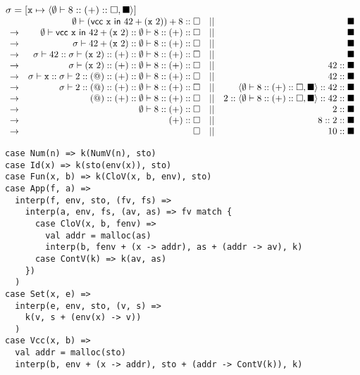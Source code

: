 $\sigma=[\texttt{x}\mapsto\langle\emptyset\vdash8::(+)::\square,\blacksquare\rangle]$
\\
$
\begin{array}{lrcr}
& \emptyset\vdash (\textsf{vcc}\ \texttt{x}\ \textsf{in}\ 42+(\texttt{x}\ 2))+8::\square &||& \blacksquare \\
\rightarrow & \emptyset\vdash\textsf{vcc}\ \texttt{x}\ \textsf{in}\ 42+(\texttt{x}\ 2)
  ::\emptyset\vdash8::(+)::\square &||& \blacksquare \\
\rightarrow & \sigma\vdash42+(\texttt{x}\ 2)
  ::\emptyset\vdash8::(+)::\square &||& \blacksquare \\
\rightarrow & \sigma\vdash42::\sigma\vdash(\texttt{x}\ 2)::(+)
  ::\emptyset\vdash8::(+)::\square &||& \blacksquare \\
\rightarrow & \sigma\vdash(\texttt{x}\ 2)::(+)
  ::\emptyset\vdash8::(+)::\square &||& 42::\blacksquare \\
\rightarrow & \sigma\vdash\texttt{x}::\sigma\vdash2::(@)::(+)
  ::\emptyset\vdash8::(+)::\square &||& 42::\blacksquare \\
\rightarrow & \sigma\vdash2::(@)::(+)::\emptyset\vdash8::(+)::\square
  &||& \langle\emptyset\vdash8::(+)::\square,\blacksquare\rangle::42::\blacksquare \\
\rightarrow & (@)::(+)::\emptyset\vdash8::(+)::\square
  &||& 2::\langle\emptyset\vdash8::(+)::\square,\blacksquare\rangle::42::\blacksquare \\
\rightarrow & \emptyset\vdash8::(+)::\square &||& 2::\blacksquare \\
\rightarrow & (+)::\square &||& 8::2::\blacksquare \\
\rightarrow & \square &||& 10::\blacksquare \\
\end{array}
$
\\

\textbf{}
\vspace{-1em}
\begin{verbatim}
case Num(n) => k(NumV(n), sto)
case Id(x) => k(sto(env(x)), sto)
case Fun(x, b) => k(CloV(x, b, env), sto)
case App(f, a) =>
  interp(f, env, sto, (fv, fs) =>
    interp(a, env, fs, (av, as) => fv match {
      case CloV(x, b, fenv) =>
        val addr = malloc(as)
        interp(b, fenv + (x -> addr), as + (addr -> av), k)
      case ContV(k) => k(av, as)
    })
  )
case Set(x, e) =>
  interp(e, env, sto, (v, s) =>
    k(v, s + (env(x) -> v))
  )
case Vcc(x, b) =>
  val addr = malloc(sto)
  interp(b, env + (x -> addr), sto + (addr -> ContV(k)), k)
\end{verbatim}

